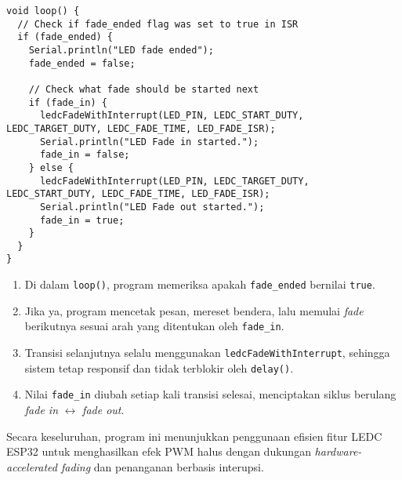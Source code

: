 \begin{verbatim}
void loop() {
  // Check if fade_ended flag was set to true in ISR
  if (fade_ended) {
    Serial.println("LED fade ended");
    fade_ended = false;

    // Check what fade should be started next
    if (fade_in) {
      ledcFadeWithInterrupt(LED_PIN, LEDC_START_DUTY, LEDC_TARGET_DUTY, LEDC_FADE_TIME, LED_FADE_ISR);
      Serial.println("LED Fade in started.");
      fade_in = false;
    } else {
      ledcFadeWithInterrupt(LED_PIN, LEDC_TARGET_DUTY, LEDC_START_DUTY, LEDC_FADE_TIME, LED_FADE_ISR);
      Serial.println("LED Fade out started.");
      fade_in = true;
    }
  }
}
\end{verbatim}
\begin{enumerate}
    \item Di dalam \texttt{loop()}, program memeriksa apakah \texttt{fade\_ended} bernilai \texttt{true}.
    \item Jika ya, program mencetak pesan, mereset bendera, lalu memulai \textit{fade} berikutnya sesuai arah yang ditentukan oleh \texttt{fade\_in}.
    \item Transisi selanjutnya selalu menggunakan \texttt{ledcFadeWithInterrupt}, sehingga sistem tetap responsif dan tidak terblokir oleh \texttt{delay()}.
    \item Nilai \texttt{fade\_in} diubah setiap kali transisi selesai, menciptakan siklus berulang \textit{fade in} $\leftrightarrow$ \textit{fade out}.
\end{enumerate}

Secara keseluruhan, program ini menunjukkan penggunaan efisien fitur LEDC ESP32 untuk menghasilkan efek PWM halus dengan dukungan \textit{hardware-accelerated fading} dan penanganan berbasis interupsi.
